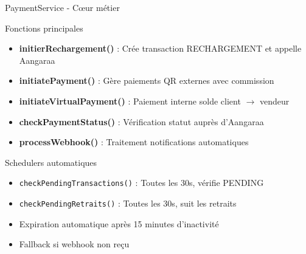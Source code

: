 \documentclass[aspectratio=169,9pt,demo]{beamer}
\begin{document}
\begin{frame}{PaymentService - Cœur métier}
\begin{block}{Fonctions principales}
\begin{itemize}
    \item \textbf{initierRechargement()} : Crée transaction RECHARGEMENT et appelle Aangaraa
    \item \textbf{initiatePayment()} : Gère paiements QR externes avec commission
    \item \textbf{initiateVirtualPayment()} : Paiement interne solde client $\rightarrow$ vendeur
    \item \textbf{checkPaymentStatus()} : Vérification statut auprès d'Aangaraa
    \item \textbf{processWebhook()} : Traitement notifications automatiques
\end{itemize}
\end{block}

\begin{block}{Schedulers automatiques}
\begin{itemize}
    \item \texttt{checkPendingTransactions()} : Toutes les 30s, vérifie PENDING
    \item \texttt{checkPendingRetraits()} : Toutes les 30s, suit les retraits
    \item Expiration automatique après 15 minutes d'inactivité
    \item Fallback si webhook non reçu
\end{itemize}
\end{block}
\end{frame}
\end{document}
